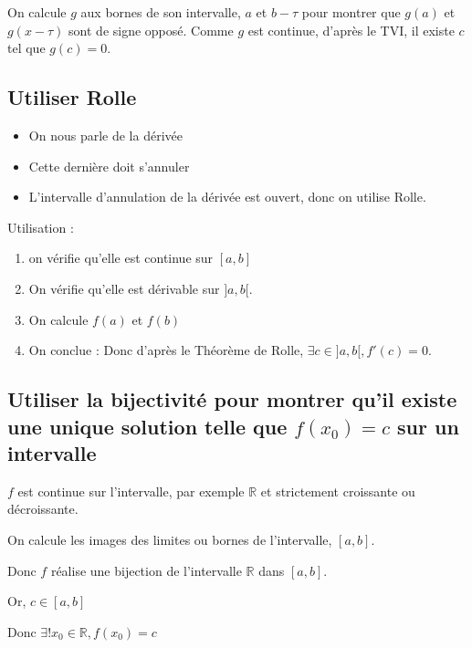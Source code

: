\documentclass[french]{yLectureNote}
\begin{document}
On calcule $g$ aux bornes de son intervalle, $a$ et $b-\tau$ pour montrer que $g(a)$ et $g(x-\tau)$ sont de signe opposé. Comme $g$ est continue, d'après le TVI, il existe $c$ tel que $g(c) = 0$.
\subsection{Utiliser Rolle}
\begin{itemize}
 \item On nous parle de la dérivée

\item Cette dernière doit s'annuler

\item L'intervalle d'annulation de la dérivée est ouvert, donc on utilise Rolle.
\end{itemize}

Utilisation :

\begin{enumerate}
 \item on vérifie qu'elle est continue sur $[a,b]$
 \item On vérifie qu'elle est dérivable sur $]a,b[$.
 \item On calcule $f(a)$ et $f(b)$
\item On conclue : Donc d'après le Théorème de Rolle, $\exists c\in]a,b[, f'(c)=0$.
\end{enumerate}
\subsection{Utiliser la bijectivité pour montrer qu'il existe une unique solution telle que $f(x_0) = c$ sur un intervalle}
$f$ est continue sur l'intervalle, par exemple $\mathbb{R}$ et strictement croissante ou décroissante.

On calcule les images des limites ou bornes de l'intervalle, $[a,b]$.

Donc $f$ réalise une bijection de l'intervalle $\mathbb{R}$ dans  $[a,b]$.

Or, $c\in[a,b]$

Donc $\exists! x_0\in \mathbb{R}, f(x_0) = c$
\end{document}
